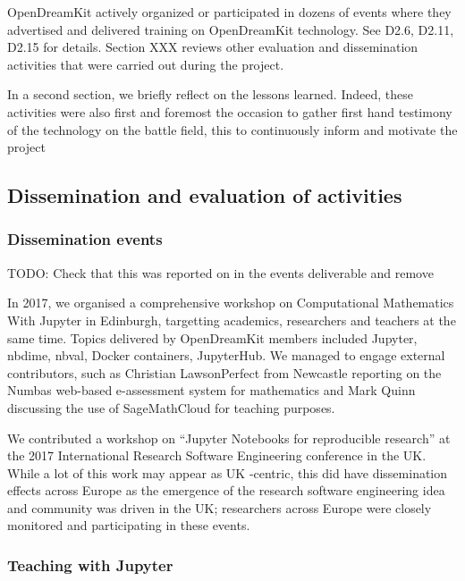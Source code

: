 \documentclass{deliverablereport}
\begin{document}
OpenDreamKit actively organized or participated in dozens of events
where they advertised and delivered training on OpenDreamKit technology.
See D2.6, D2.11, D2.15 for details. Section XXX reviews other evaluation
and dissemination activities that were carried out during the project.

In a second section, we briefly reflect on the lessons learned. Indeed,
these activities were also first and foremost the occasion to gather
first hand testimony of the technology on the battle field, this to
continuously inform and motivate the project

\hypertarget{dissemination-and-evaluation-of-activities}{%
\subsection{Dissemination and evaluation of
activities}\label{dissemination-and-evaluation-of-activities}}

\hypertarget{dissemination-events}{%
\subsubsection{Dissemination events}\label{dissemination-events}}

TODO: Check that this was reported on in the events deliverable and
remove

In 2017, we organised a comprehensive workshop on Computational
Mathematics With Jupyter in Edinburgh, targetting academics, researchers
and teachers at the same time. Topics delivered by OpenDreamKit members
included Jupyter, nbdime, nbval, Docker containers, JupyterHub. We
managed to engage external contributors, such as Christian
Lawson­Perfect from Newcastle reporting on the Numbas web-based
e-assessment system for mathematics and Mark Quinn discussing the use of
SageMathCloud for teaching purposes.

We contributed a workshop on ``Jupyter Notebooks for reproducible
research'' at the 2017 International Research Software Engineering
conference in the UK. While a lot of this work may appear as UK
-centric, this did have dissemination effects across Europe as the
emergence of the research software engineering idea and community was
driven in the UK; researchers across Europe were closely monitored and
participating in these events.

\hypertarget{teaching-with-jupyter}{%
\subsubsection{Teaching with Jupyter}\label{teaching-with-jupyter}}
\end{document}
